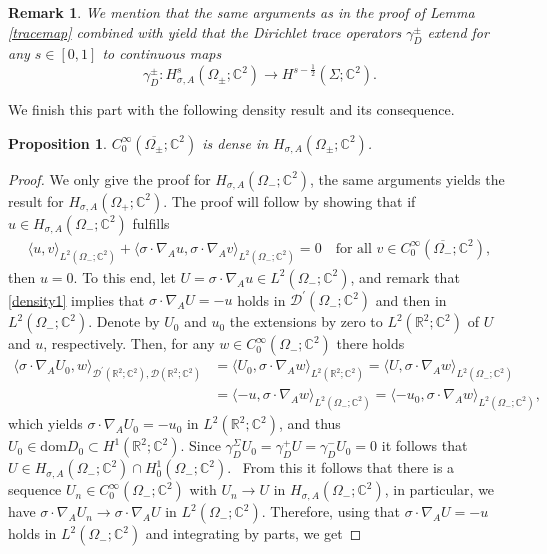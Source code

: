 \documentclass[11pt,a4paper,reqno,oneside]{amsproc}
\DeclareMathOperator{\dom}{dom}
\def \rr {{\mathbb R}}
\def \cc {{\mathbb C}}
\numberwithin{equation}{section}
\def\dom{\mathrm{dom}}
\def \cc {{\mathbb{C}}}
\newtheorem{proposition}[definition]{Proposition}
\newtheorem{remark}[definition]{Remark}
\begin{document}
\begin{remark}\label{extTr} We mention that the same arguments as in the proof of Lemma \ref{tracemap} combined with \cite[Corollary~4.6]{BHSLS24} yield that 
the Dirichlet trace operators $\gamma_D^\pm$ extend for any $s\in[0,1]$ to continuous maps 
\[
\gamma_D^\pm:H^s_{\sigma, A}(\Omega_\pm; \mathbb{C}^2)\rightarrow H^{s-\frac{1}{2}}(\Sigma; \mathbb{C}^2). 
\] 
\end{remark}




We finish this part with the following density result and its consequence.
\begin{proposition}\label{density_result} $C^\infty_0(\overline{\Omega_\pm};\cc^2)$ is dense in $H_{\sigma, A}(\Omega_\pm;\cc^2)$.
\end{proposition}
\begin{proof} We only give the proof for $H_{\sigma, A}(\Omega_-;\cc^2)$, the same arguments yields the result for $H_{\sigma, A}(\Omega_+;\cc^2)$. The proof will follow by showing that if $u\in H_{\sigma, A}(\Omega_-;\cc^2)$ fulfills 
\begin{align}\label{density1}
   \langle u,v\rangle_{L^2(\Omega_-;\cc^2)} + \langle \sigma\cdot\nabla_A u, \sigma\cdot\nabla_A v\rangle_{L^2(\Omega_-;\cc^2)}=0 \quad \text{for all } v\in C^\infty_0(\overline{\Omega_-};\cc^2),
\end{align}
then $u=0$. To this end, let $U=\sigma\cdot\nabla_A u \in L^2(\Omega_-;\cc^2)$, and remark that \eqref{density1} implies that $\sigma\cdot\nabla_A U=-u$ holds in $\mathcal{D}^\prime(\Omega_-;\cc^2)$ and then in $L^2(\Omega_-;\cc^2)$. Denote by $U_0$ and $u_0$ the extensions by zero to $L^2(\rr^2;\cc^2)$ of $U$ and $u$, respectively. Then, for any $w\in C^\infty_0(\Omega_-;\cc^2)$ there holds
\begin{align*}
\langle\sigma\cdot\nabla_A U_0, w\rangle_{\mathcal{D}^\prime(\rr^2;\cc^2),\mathcal{D}(\rr^2;\cc^2)}&=\langle U_0, \sigma\cdot\nabla_A  w\rangle_{L^2(\rr^2;\cc^2)}=\langle U, \sigma\cdot\nabla_A  w\rangle_{L^2(\Omega_-;\cc^2)}\\
&=\langle - u, \sigma\cdot\nabla_A  w\rangle_{L^2(\Omega_-;\cc^2)}=\langle - u_0, \sigma\cdot\nabla_A  w\rangle_{L^2(\Omega_-;\cc^2)},
\end{align*}
which yields $\sigma\cdot\nabla_A U_0=-u_0$ in $L^2(\rr^2;\cc^2)$, and thus $U_0\in\dom D_0\subset H^1(\rr^2;\cc^2)$. Since $\gamma_D^\Sigma U_0=\gamma_D^+U= \gamma_D^-U_0=0$ it follows that $U\in H_{\sigma, A}(\Omega_-;\cc^2)\cap  H^1_0  (\Omega_-;\cc^2)$. \ From this it follows that there is a sequence $U_n\in C^\infty_0(\Omega_-;\cc^2)$ with $U_n \longrightarrow U$ in $H_{\sigma, A}(\Omega_-;\cc^2)$, in particular, we have $\sigma\cdot\nabla_A U_n \longrightarrow \sigma\cdot\nabla_A U$ in $L^2(\Omega_-;\cc^2)$. Therefore, using that $\sigma\cdot\nabla_A U=-u$ holds in $L^2(\Omega_-;\cc^2)$ and integrating by parts,  we get 

\end{proof}
\end{document}
